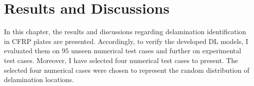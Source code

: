 \chapter[Results and Discussions]{Results and Discussions}
\label{ch5}

In this chapter, the results and discussions regarding delamination identification in CFRP plates are presented. 
Accordingly, to verify the developed DL models, I evaluated them on \(95\) unseen numerical test cases and further on experimental test cases.
Moreover, I have selected four numerical test cases to present. 
The selected four numerical cases were chosen to represent the random distribution of delamination locations.
%
